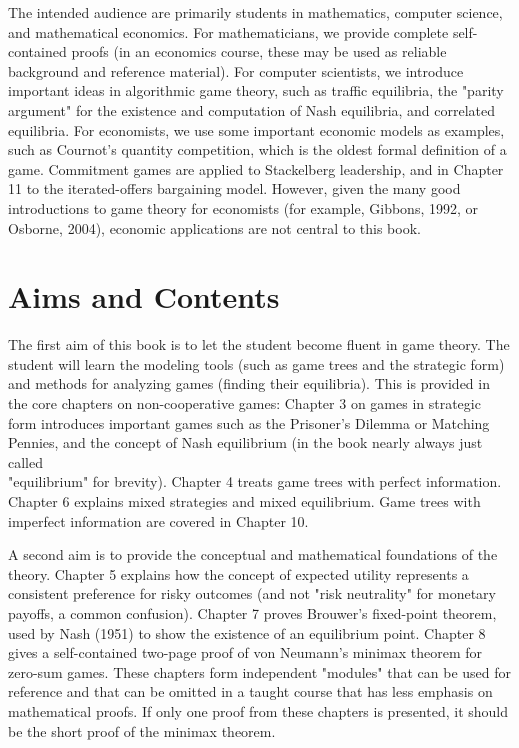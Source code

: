 \documentclass[12pt]{article}
\begin{document}
The intended audience are primarily students in mathematics, computer science, and mathematical economics. For mathematicians, we provide complete self-contained proofs (in an economics course, these may be used as reliable background and reference material). For computer scientists, we introduce important ideas in algorithmic game theory, such as traffic equilibria, the "parity argument" for the existence and computation of Nash equilibria, and correlated equilibria. For economists, we use some important economic models as examples, such as Cournot's quantity competition, which is the oldest formal definition of a game. Commitment games are applied to Stackelberg leadership, and in Chapter 11 to the iterated-offers bargaining model. However, given the many good introductions to game theory for economists (for example, Gibbons, 1992, or Osborne, 2004), economic applications are not central to this book.

\section*{Aims and Contents}
The first aim of this book is to let the student become fluent in game theory. The student will learn the modeling tools (such as game trees and the strategic form) and methods for analyzing games (finding their equilibria). This is provided in the core chapters on non-cooperative games: Chapter 3 on games in strategic form introduces important games such as the Prisoner's Dilemma or Matching Pennies, and the concept of Nash equilibrium (in the book nearly always just called\\
"equilibrium" for brevity). Chapter 4 treats game trees with perfect information. Chapter 6 explains mixed strategies and mixed equilibrium. Game trees with imperfect information are covered in Chapter 10.

A second aim is to provide the conceptual and mathematical foundations of the theory. Chapter 5 explains how the concept of expected utility represents a consistent preference for risky outcomes (and not "risk neutrality" for monetary payoffs, a common confusion). Chapter 7 proves Brouwer's fixed-point theorem, used by Nash (1951) to show the existence of an equilibrium point. Chapter 8 gives a self-contained two-page proof of von Neumann's minimax theorem for zero-sum games. These chapters form independent "modules" that can be used for reference and that can be omitted in a taught course that has less emphasis on mathematical proofs. If only one proof from these chapters is presented, it should be the short proof of the minimax theorem.
\end{document}
